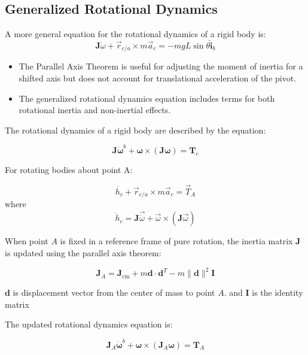 \subsection{Generalized Rotational Dynamics}
A more general equation for the rotational dynamics of a rigid body is:
\[
\mathbf{J} \dot{\omega} + \vec{r}_{c/a} \times m \vec{a}_c = -mgL \sin \theta \hat{\mathbf{i}}_b
\]
\begin{itemize}
    \item The Parallel Axis Theorem is useful for adjusting the moment of inertia for a shifted axis but does not account for translational acceleration of the pivot.
    \item The generalized rotational dynamics equation includes terms for both rotational inertia and non-inertial effects.
\end{itemize}

The rotational dynamics of a rigid body are described by the equation:

\[
\mathbf{J} \dot{\boldsymbol{\omega}}^b + \boldsymbol{\omega} \times (\mathbf{J} \boldsymbol{\omega}) = \mathbf{T}_c
\]


For rotating bodies about point A:

\[
\dot{h_c} + \vec{r}_{c/a} \times m \vec{a}_c = \vec{T}_A
\]
where 
\[
\dot{h}_c = \mathbf{J} \vec{\dot{\omega}} + \vec{\omega} \times (\mathbf{J} \vec{\omega})
\]

When point \( A \) is fixed in a reference frame of pure rotation, the inertia matrix \( \mathbf{J} \) is updated using the parallel axis theorem:

\[
\mathbf{J}_A = \mathbf{J}_{\text{cm}} + m \mathbf{d} \cdot \mathbf{d}^T - m \|\mathbf{d}\|^2 \mathbf{I}
\]

 $\textbf{d}$ is displacement vector from the center of mass to point \( A \). and $\textbf{I}$ is the identity matrix

The updated rotational dynamics equation is:

\[
\mathbf{J}_A \dot{\boldsymbol{\omega}}^b + \boldsymbol{\omega} \times (\mathbf{J}_A \boldsymbol{\omega}) = \mathbf{T}_A
\]



